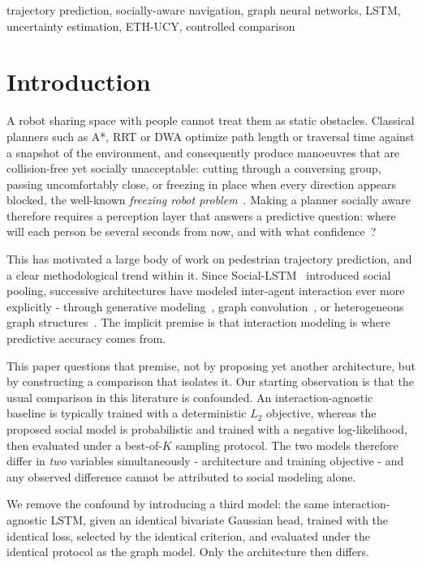 \documentclass[conference]{IEEEtran}
\begin{document}
\begin{IEEEkeywords}
trajectory prediction, socially-aware navigation, graph neural networks, LSTM,
uncertainty estimation, ETH-UCY, controlled comparison
\end{IEEEkeywords}

\section{Introduction}

A robot sharing space with people cannot treat them as static obstacles. Classical
planners such as A*, RRT or DWA optimize path length or traversal time against a snapshot
of the environment, and consequently produce manoeuvres that are collision-free yet
socially unacceptable: cutting through a conversing group, passing uncomfortably close, or
freezing in place when every direction appears blocked, the well-known \emph{freezing
robot problem}~\cite{trautman2010unfreezing}. Making a planner socially aware therefore
requires a perception layer that answers a predictive question: where will each person be
several seconds from now, and with what confidence~\cite{mavrogiannis2023core}?

This has motivated a large body of work on pedestrian trajectory prediction, and a clear
methodological trend within it. Since Social-LSTM~\cite{alahi2016social} introduced social
pooling, successive architectures have modeled inter-agent interaction ever more
explicitly - through generative modeling~\cite{gupta2018social}, graph
convolution~\cite{mohamed2020social}, or heterogeneous graph
structures~\cite{salzmann2020trajectron}. The implicit premise is that interaction
modeling is where predictive accuracy comes from.

This paper questions that premise, not by proposing yet another architecture, but by
constructing a comparison that isolates it. Our starting observation is that the usual
comparison in this literature is confounded. An interaction-agnostic baseline is typically
trained with a deterministic $L_2$ objective, whereas the proposed social model is
probabilistic and trained with a negative log-likelihood, then evaluated under a
best-of-$K$ sampling protocol. The two models therefore differ in \emph{two} variables
simultaneously - architecture and training objective - and any observed difference cannot
be attributed to social modeling alone.

We remove the confound by introducing a third model: the same interaction-agnostic LSTM,
given an identical bivariate Gaussian head, trained with the identical loss, selected by
the identical criterion, and evaluated under the identical protocol as the graph model.
Only the architecture then differs.
\end{document}
